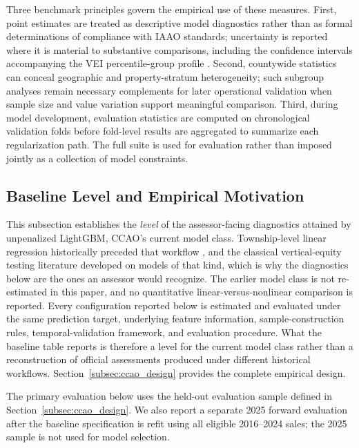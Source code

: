 \documentclass[10pt]{article}
\theoremstyle{definition}
\newcommand{\1}{\mathbf{1}}
\begin{document}
{Three benchmark principles govern the empirical use of these measures. First, point estimates are treated as descriptive model diagnostics rather than as formal determinations of compliance with IAAO standards; uncertainty is reported where it is material to substantive comparisons, including the confidence intervals accompanying the VEI percentile-group profile \cite{IAAO2013Ratio,IAAO2026ExposureRatio}. Second, countywide statistics can conceal geographic and property-stratum heterogeneity; such subgroup analyses remain necessary complements for later operational validation when sample size and value variation support meaningful comparison. Third, during model development, evaluation statistics are computed on chronological validation folds before fold-level results are aggregated to summarize each regularization path. The full suite is used for evaluation rather than imposed jointly as a collection of model constraints.}


\subsection{Baseline Level and Empirical Motivation}
\label{subsec:baseline_tension}

This subsection establishes the \emph{level} of the assessor-facing diagnostics attained by unpenalized LightGBM, CCAO's current model class. Township-level linear regression historically preceded that workflow \cite{CCAOModelResAVM2026}, and the classical vertical-equity testing literature \cite{PaglinFogarty1972,Cheng1974,Edelstein1979,SundermanEtAl1990} developed on models of that kind, which is why the diagnostics below are the ones an assessor would recognize. The earlier model class is not re-estimated in this paper, and no quantitative linear-versus-nonlinear comparison is reported. Every configuration reported below is estimated and evaluated under the same prediction target,
underlying feature information, sample-construction rules, temporal-validation
framework, and evaluation procedure. What the baseline table reports is therefore a
level for the current model class rather than a reconstruction of official
assessments produced under different historical workflows.
Section~\ref{subsec:ccao_design} provides the complete empirical design.

{The primary evaluation below uses the held-out evaluation sample defined in Section~\ref{subsec:ccao_design}. We also report a separate 2025 forward evaluation after the baseline specification is refit using all eligible 2016--2024 sales; the 2025 sample is not used for model selection.}
\end{document}
